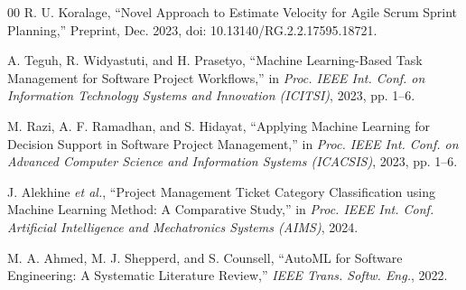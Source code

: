 \documentclass[conference]{IEEEtran}
\begin{document}
\begin{thebibliography}{00}
R. U. Koralage, ``Novel Approach to Estimate Velocity for Agile Scrum Sprint Planning,''
Preprint, Dec. 2023, doi: 10.13140/RG.2.2.17595.18721.

A. Teguh, R. Widyastuti, and H. Prasetyo,
``Machine Learning-Based Task Management for Software Project Workflows,''
in \textit{Proc. IEEE Int. Conf. on Information Technology Systems and Innovation (ICITSI)}, 2023, pp. 1--6.

M. Razi, A. F. Ramadhan, and S. Hidayat,
``Applying Machine Learning for Decision Support in Software Project Management,''
in \textit{Proc. IEEE Int. Conf. on Advanced Computer Science and Information Systems (ICACSIS)}, 2023, pp. 1--6.

J. Alekhine \textit{et al.}, ``Project Management Ticket Category Classification using Machine Learning Method: A Comparative Study,''
in \textit{Proc. IEEE Int. Conf. Artificial Intelligence and Mechatronics Systems (AIMS)}, 2024.

M. A. Ahmed, M. J. Shepperd, and S. Counsell,
``AutoML for Software Engineering: A Systematic Literature Review,''
\textit{IEEE Trans. Softw. Eng.}, 2022.



\end{thebibliography}
\end{document}
